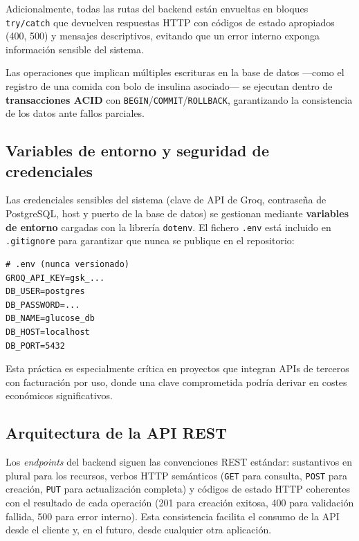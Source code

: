 Adicionalmente, todas las rutas del backend están envueltas en bloques \texttt{try/catch}
que devuelven respuestas HTTP con códigos de estado apropiados (400, 500) y mensajes
descriptivos, evitando que un error interno exponga información sensible del sistema.

Las operaciones que implican múltiples escrituras en la base de datos —como el registro
de una comida con bolo de insulina asociado— se ejecutan dentro de
\textbf{transacciones ACID} con \texttt{BEGIN}/\texttt{COMMIT}/\texttt{ROLLBACK},
garantizando la consistencia de los datos ante fallos parciales.

\subsection{Variables de entorno y seguridad de credenciales}
\label{subsec:env-vars}

Las credenciales sensibles del sistema (clave de API de Groq, contraseña de PostgreSQL,
host y puerto de la base de datos) se gestionan mediante \textbf{variables de entorno}
cargadas con la librería \texttt{dotenv}. El fichero \texttt{.env} está incluido en
\texttt{.gitignore} para garantizar que nunca se publique en el repositorio:

\begin{verbatim}
# .env (nunca versionado)
GROQ_API_KEY=gsk_...
DB_USER=postgres
DB_PASSWORD=...
DB_NAME=glucose_db
DB_HOST=localhost
DB_PORT=5432
\end{verbatim}

Esta práctica es especialmente crítica en proyectos que integran APIs de terceros con
facturación por uso, donde una clave comprometida podría derivar en costes económicos
significativos.

\subsection{Arquitectura de la API REST}
\label{subsec:api-rest}

Los \textit{endpoints} del backend siguen las convenciones REST estándar: sustantivos
en plural para los recursos, verbos HTTP semánticos (\texttt{GET} para consulta,
\texttt{POST} para creación, \texttt{PUT} para actualización completa) y códigos de
estado HTTP coherentes con el resultado de cada operación (201 para creación exitosa,
400 para validación fallida, 500 para error interno). Esta consistencia facilita el
consumo de la API desde el cliente y, en el futuro, desde cualquier otra aplicación.


